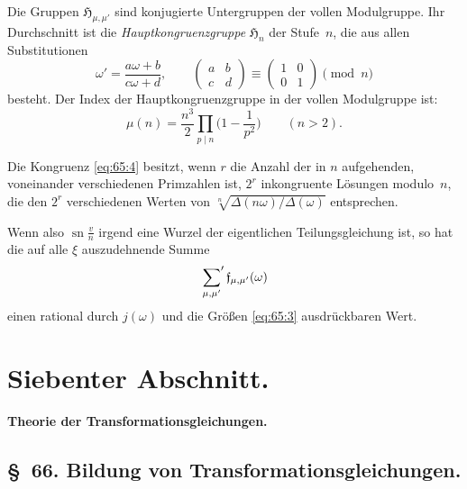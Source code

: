\documentclass[11pt,a4paper]{article}
\theoremstyle{plain}
\theoremstyle{remark}
\newcommand{\ff}{\mathfrak{f}}
\begin{document}
Die Gruppen $\mathfrak{H}_{\mu,\mu'}$ sind konjugierte
Untergruppen der vollen Modulgruppe. Ihr Durchschnitt ist die
\emph{Hauptkongruenzgruppe} $\mathfrak{H}_n$ der Stufe~$n$, die
aus allen Substitutionen
\[
\omega' = \frac{a\omega+b}{c\omega+d},\qquad
\begin{pmatrix} a & b \\ c & d \end{pmatrix}
\equiv
\begin{pmatrix} 1 & 0 \\ 0 & 1 \end{pmatrix} \pmod{n}
\]
besteht. Der Index der Hauptkongruenzgruppe in der vollen
Modulgruppe ist:
\begin{equation}\label{eq:65:4}
\mu(n) = \frac{n^3}{2}\prod_{p\mid n}\biggl(1-\frac{1}{p^2}\biggr)
\qquad (n > 2).
\end{equation}

Die Kongruenz \eqref{eq:65:4} besitzt, wenn $r$ die Anzahl der
in $n$ aufgehenden, voneinander verschiedenen Primzahlen ist,
$2^r$ inkongruente Lösungen modulo~$n$, die den $2^r$
verschiedenen Werten von $\sqrt[n]{\Delta(n\omega)/\Delta(\omega)}$
entsprechen.

Wenn also $\operatorname{sn}\frac{v}{n}$ irgend eine Wurzel der
eigentlichen Teilungsgleichung ist, so hat die auf alle
$\xi$ auszudehnende Summe
\begin{equation}\label{eq:65:5}
\sideset{}{'}\sum_{\mu,\mu'}
\ff_{\mu,\mu'}(\omega)
\end{equation}
einen rational durch $j(\omega)$ und die Größen
\eqref{eq:65:3} ausdrückbaren Wert.


\section*{Siebenter Abschnitt.}
\begin{center}
\textbf{\large Theorie der Transformationsgleichungen.}
\end{center}
\vspace{0.5\baselineskip}

\subsection*{§~66. Bildung von Transformationsgleichungen.}
\end{document}
